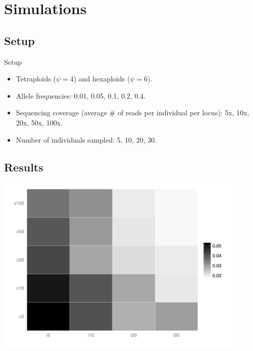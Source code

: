\documentclass[presentation]{beamer}
\begin{document}
\section{Simulations}

\subsection{Setup}

\begin{frame}[t]{Setup}
	\begin{itemize}
		\item Tetraploids ($\psi=4$) and hexaploids ($\psi=6$).
		\item Allele frequencies: 0.01, 0.05, 0.1, 0.2, 0.4.
		\item Sequencing coverage (average \# of reads per individual per locus): 5x, 10x, 20x, 50x, 100x.
		\item Number of individuals sampled: 5, 10, 20, 30.
	\end{itemize}
\end{frame}

\subsection{Results}

\begin{frame}[c]{}
	\begin{center}
		\includegraphics[width=0.9\textwidth]{fig/hex-plot0-05}
	\end{center}
\end{frame}
\end{document}
